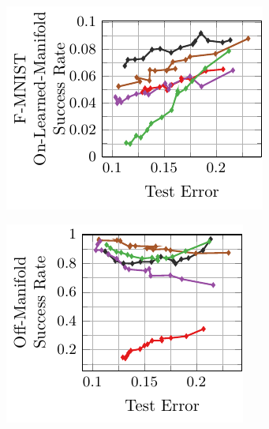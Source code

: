 \begin{appendix}
\begin{figure}[t]
    \begin{subfigure}{0.255\textwidth}
        \centering
        \includegraphics[width=\textwidth]{appendix_l2_fashion_error_on_learned_madry.pdf}
    \end{subfigure}
    \begin{subfigure}{0.235\textwidth}
        \centering
        \includegraphics[width=\textwidth]{appendix_l2_fashion_error_off_madry.pdf}
    \end{subfigure}
    \begin{subfigure}{0.235\textwidth}
        \centering

\end{subfigure}
\end{figure}
\end{appendix}
